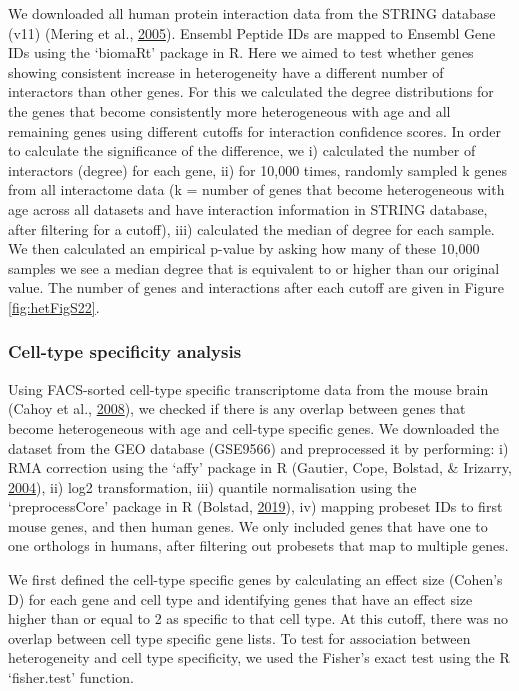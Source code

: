 \documentclass[12pt,twoside]{unicam}
\begin{document}
We downloaded all human protein interaction data from the STRING database (v11) (Mering et al., \protect\hyperlink{ref-VonMering2005}{2005}). Ensembl Peptide IDs are mapped to Ensembl Gene IDs using the `biomaRt' package in R. Here we aimed to test whether genes showing consistent increase in heterogeneity have a different number of interactors than other genes. For this we calculated the degree distributions for the genes that become consistently more heterogeneous with age and all remaining genes using different cutoffs for interaction confidence scores. In order to calculate the significance of the difference, we i) calculated the number of interactors (degree) for each gene, ii) for 10,000 times, randomly sampled k genes from all interactome data (k = number of genes that become heterogeneous with age across all datasets and have interaction information in STRING database, after filtering for a cutoff), iii) calculated the median of degree for each sample. We then calculated an empirical p-value by asking how many of these 10,000 samples we see a median degree that is equivalent to or higher than our original value. The number of genes and interactions after each cutoff are given in Figure \ref{fig:hetFigS22}.

\hypertarget{cell-type-specificity-analysis}{%
\subsubsection{Cell-type specificity analysis}\label{cell-type-specificity-analysis}}

Using FACS-sorted cell-type specific transcriptome data from the mouse brain (Cahoy et al., \protect\hyperlink{ref-Cahoy2008}{2008}), we checked if there is any overlap between genes that become heterogeneous with age and cell-type specific genes. We downloaded the dataset from the GEO database (GSE9566) and preprocessed it by performing: i) RMA correction using the `affy' package in R (Gautier, Cope, Bolstad, \& Irizarry, \protect\hyperlink{ref-Gautier2004}{2004}), ii) log2 transformation, iii) quantile normalisation using the `preprocessCore' package in R (Bolstad, \protect\hyperlink{ref-Bolstad2019}{2019}), iv) mapping probeset IDs to first mouse genes, and then human genes. We only included genes that have one to one orthologs in humans, after filtering out probesets that map to multiple genes.

We first defined the cell-type specific genes by calculating an effect size (Cohen's D) for each gene and cell type and identifying genes that have an effect size higher than or equal to 2 as specific to that cell type. At this cutoff, there was no overlap between cell type specific gene lists. To test for association between heterogeneity and cell type specificity, we used the Fisher's exact test using the R `fisher.test' function.
\end{document}

